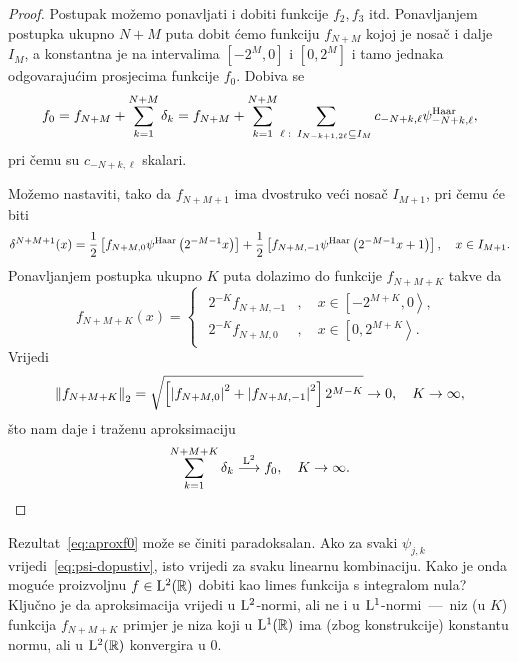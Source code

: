 \documentclass[main.tex]{subfiles}
\begin{document}
\begin{proof}
	Postupak možemo ponavljati i dobiti funkcije \( f_2, f_3 \) itd. Ponavljanjem
	postupka ukupno \( N+M \) puta dobit ćemo funkciju \( f_{N+M} \)
	kojoj je nosač i dalje \( I_M \), a konstantna je na intervalima
	\( \left[ -2^M,0 \right] \) i \( \left[ 0,2^M \right] \)
	i tamo jednaka odgovarajućim prosjecima funkcije \( f_0 \).
	Dobiva se
	\begin{equation}
		f_0 = f_{N+M} + \sum_{k=1}^{N+M} \delta_k
		= f_{N+M} + \sum_{k=1}^{N+M} \sum_{\ell \, \colon \, I_{N-k+1, 2\ell} \subseteq I_M}
		c_{-N+k, \ell} \psi^{\mathrm{Haar}}_{-N+k,\ell},
	\end{equation}
	pri čemu su \( c_{-N+k,\ell} \) skalari.

	Možemo nastaviti, tako da \( f_{N+M+1} \) ima
	dvostruko veći nosač \( I_{M+1} \), pri čemu će biti
	\[ \delta^{N+M+1}(x) = \frac12 \left[ f_{N+M,0} \psi^{\mathrm{Haar}}\left( 2^{-M-1}x \right) \right]
		+ \frac 12 \left[ f_{N+M,-1}\psi^{\mathrm{Haar}}\left( 2^{-M-1}x + 1 \right) \right],
		\quad x \in I_{M+1}.\]
	Ponavljanjem postupka ukupno \( K \) puta dolazimo do funkcije
	\( f_{N+M+K} \) takve da
	\begin{equation}
		f_{N+M+K}(x) = \begin{cases}
			\begin{aligned}
				2^{-K}f_{N+M,-1} & , \quad  x \in  \left[ -2^{M+K}, 0 \right\rangle, \\
				2^{-K}f_{N+M,0}  & , \quad x \in \left[ 0, 2^{M+K} \right\rangle.
			\end{aligned}
		\end{cases}
	\end{equation}
	Vrijedi \begin{equation} \left\lVert f_{N+M+K}\right\rVert_2 = \sqrt{\left[ \left| {f_{N+M,0}} \right|^2+\left| {f_{N+M,-1}} \right|^2 \right] 2^{M-K}} \rightarrow 0, \quad K \rightarrow \infty,
	\end{equation}
	što nam daje i traženu aproksimaciju
	\begin{equation}\label{eq:aproxf0}
		\sum_{k=1}^{N+M+K} \delta_k \stackrel{\mathrm{L}^2}{\longrightarrow} f_0, \quad K \rightarrow \infty.
	\end{equation}
\end{proof}

\begin{komentar}
	Rezultat~\eqref{eq:aproxf0} može se činiti paradoksalan.
	Ako za svaki \( \psi_{j,k} \) vrijedi~\eqref{eq:psi-dopustiv},
	isto vrijedi za svaku linearnu kombinaciju. Kako je onda moguće proizvoljnu
	\( f \in \mathrm{L}^2(\mathbb{R}) \) dobiti kao limes funkcija s integralom nula?
	Ključno je da aproksimacija vrijedi u \( \mathrm{L}^2 \)-normi,
	ali ne i u \( \mathrm{L}^1 \)-normi~---~niz (u \(K\)) funkcija \( f_{N+M+K} \)
	primjer je niza koji u \( \mathrm{L}^1(\mathbb{R}) \) ima (zbog konstrukcije) konstantu normu, ali u \( \mathrm{L}^2(\mathbb{R}) \)
	konvergira u \( 0 \).
\end{komentar}
\end{document}
